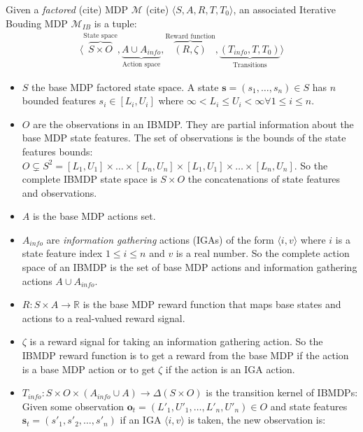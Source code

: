 \begin{definition}
Given a \textit{factored} (cite) MDP $\mathcal{M}$ (cite) $\langle S, A, R, T, T_0 \rangle$, an associated Iterative Bouding MDP $\mathcal{M}_{IB}$ is a tuple:
\begin{align*}
    \langle \overbrace{S \times O}^{\text{State space}}, \underbrace{A \cup A_{info}}_{\text{Action space}}, \overbrace{(R, \zeta)}^{\text{Reward function}}, \underbrace{(T_{info}, T, T_0)}_{\text{Transitions}}\rangle
\end{align*}

\begin{itemize}
\item $S$ the base MDP factored state space. A state $\boldsymbol{s} = (s_1, \dots, s_n)\in S$ has $n$ bounded features $s_i \in [L_i, U_i]$ where $\infty < L_i \leq U_i < \infty \forall 1\leq i \leq n$.
\item $O$ are the observations in an IBMDP. They are partial information about the base MDP state features. The set of observations is the bounds of the state features bounds: $O\subsetneq S^2 =  [L_1, U_1]\times \dots \times [L_n, U_n] \times [L_1, U_1]\times \dots \times [L_n, U_n]$. So the complete IBMDP state space is $S \times O$ the concatenations of state features and observations.
\item $A$ is the base MDP actions set.
\item $A_{info}$ are \textit{information gathering} actions (IGAs) of the form $\langle i, v \rangle$ where $i$ is a state feature index $1 \leq i \leq n$ and $v$ is a real number. So the complete action space of an IBMDP is the set of base MDP actions and information gathering actions $A \cup A_{info}$.
\item $R: S\times A \rightarrow \mathbb{R}$ is the base MDP reward function that maps base states and actions to a real-valued reward signal.
\item $\zeta$ is a reward signal for taking an information gathering action. So the IBMDP reward function is to get a reward from the base MDP if the action is a base MDP action or to get $\zeta$ if the action is an IGA action.
\item $T_{info}: S\times O \times( A_{info} \cup A )\rightarrow \Delta (S\times O)$ is the transition kernel of IBMDPs: 
Given some observation $\boldsymbol{o}_t = (L'_1, U'_1, \dots, L'_n, U'_n) \in O$ and state features $\boldsymbol{s}_t=(s'_1, s'_2, \dots, s'_n)$ if an IGA $\langle i, v \rangle$ is taken, the new observation is:

\end{itemize}
\end{definition}
